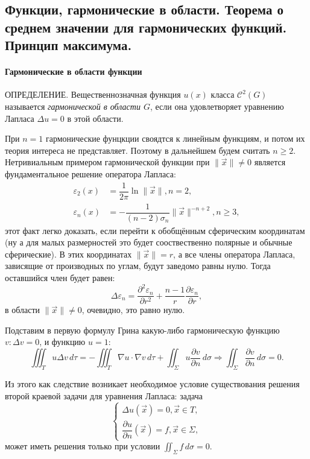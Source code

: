 \subsection{Функции, гармонические в области. Теорема о среднем значении для гармонических
функций. Принцип максимума.}
\label{max}

\paragraph{Гармонические в области функции}
ОПРЕДЕЛЕНИЕ. Вещественнозначная функция $u(x)$ класса $\mathcal{C}^2 (G)$ называется 
\emph{гармонической в области $G$}, если она удовлетворяет уравнению Лапласа $\Delta u = 0$
в этой области.

При $n=1$ гармонические фунцкции своядтся к линейным функциям, и потом их теория интереса
не представляет. Поэтому в дальнейшем будем считать $n \geqslant 2$. Нетривиальным примером
гармонической функции при $\| \vec{x} \| \neq 0$ является фундаментальное решение оператора
Лапласа:
\begin{align*}
  \varepsilon_2 (x) &= \dfrac{1}{2\pi} \ln \| \vec{x} \|, n = 2, \\
  \varepsilon_n (x) &= - \dfrac{1}{(n-2) \sigma_n} \| \vec{x} \|^{-n+2}, n \geqslant 3,
\end{align*}
этот факт легко доказать, если перейти к обобщённым сферическим координатам (ну а для малых
размерностей это будет сооствественно полярные и обычные сферические). В этих координатах
$\| \vec{x} \| = r$, а все члены оператора Лапласа, зависящие от производных по углам, будут
заведомо равны нулю. Тогда оставшийся член будет равен:
\[
  \Delta \varepsilon_n = 
  \dfrac{\partial^2 \varepsilon_n}{\partial r^2} 
  + \dfrac{n-1}{r} \dfrac{\partial \varepsilon_n}{\partial r}, 
\]
в области $\|\vec{x}\| \neq 0$, очевидно, это равно нулю.

Подставим в первую формулу Грина какую-либо гармоническую функцию $v : \Delta v = 0$, и функцию 
$u = 1$:
\[
  \iiint_T u \Delta v \, d\tau = - \iiint_T \nabla u \cdot \nabla v \, d\tau
    + \iint_\Sigma u \dfrac{\partial v}{\partial n} \, d\sigma
  \Rightarrow
  \iint_\Sigma \dfrac{\partial v}{\partial n} \, d\sigma = 0.
\]

Из этого как следствие возникает необходимое условие существования решения второй краевой задачи
для уравнения Лапласа: задача
\[
  \begin{cases}
    \Delta u(\vec{x}) = 0, \vec{x} \in T, \\
    \dfrac{\partial u}{\partial n} (\vec{x}) = f, \vec{x} \in \Sigma,
  \end{cases}
\]
может иметь решения только при условии $\iint_\Sigma f \, d\sigma = 0$.

